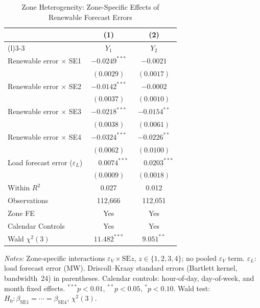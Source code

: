 \documentclass{article}
\begin{document}
\begin{table}[htbp]
\centering
\caption{Zone Heterogeneity: Zone-Specific Effects of Renewable Forecast Errors}
\label{tab:h3}
\begin{threeparttable}
\begin{tabularx}{\linewidth}{>{\raggedright\arraybackslash}Xcc}
\toprule
 & (1) & (2) \\
\cmidrule(r){2-2}\cmidrule(l){3-3}
 & $Y_1$ & $Y_2$ \\
\midrule
Renewable error $\times$ SE1 & $-0.0249^{***}$ & $-0.0021$ \\
 & $(0.0029)$ & $(0.0017)$ \\[0.4ex]
Renewable error $\times$ SE2 & $-0.0142^{***}$ & $-0.0002$ \\
 & $(0.0037)$ & $(0.0010)$ \\[0.4ex]
Renewable error $\times$ SE3 & $-0.0218^{***}$ & $-0.0154^{**}$ \\
 & $(0.0038)$ & $(0.0061)$ \\[0.4ex]
Renewable error $\times$ SE4 & $-0.0324^{***}$ & $-0.0226^{**}$ \\
 & $(0.0062)$ & $(0.0100)$ \\[0.4ex]
Load forecast error ($\varepsilon_L$) & $\phantom{-}0.0074^{***}$ & $\phantom{-}0.0203^{***}$ \\
 & $(0.0009)$ & $(0.0018)$ \\
\midrule
Within $R^2$ & 0.027 & 0.012 \\
Observations & 112,666 & 112,051 \\
Zone FE & Yes & Yes \\
Calendar Controls & Yes & Yes \\
Wald $\chi^2(3)$ & $11.482^{***}$ & $9.051^{**}$ \\
\bottomrule
\end{tabularx}
\begin{tablenotes}[flushleft]
\footnotesize
\item \textit{Notes:} Zone-specific interactions $\varepsilon_V \times \mathrm{SE}z$, $z \in \{1,2,3,4\}$; no pooled $\varepsilon_V$ term. $\varepsilon_L$: load forecast error (MW). Driscoll--Kraay standard errors (Bartlett kernel, bandwidth~24) in parentheses. Calendar controls: hour-of-day, day-of-week, and month fixed effects. $^{***}p<0.01$, $^{**}p<0.05$, $^{*}p<0.10$. Wald test: $H_0\colon \beta_{\mathrm{SE1}}=\cdots=\beta_{\mathrm{SE4}}$, $\chi^2(3)$.
\end{tablenotes}
\end{threeparttable}
\end{table}
\end{document}
